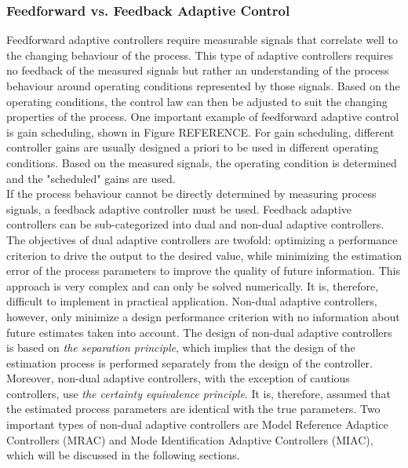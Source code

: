 \documentclass[9pt, twoside]{article}
\begin{document}
\begin{multicols}{2}
\subsubsection{Feedforward vs. Feedback Adaptive Control}
Feedforward adaptive controllers require measurable signals that correlate well to the changing behaviour of the process. This type of adaptive controllers requires no feedback of the measured signals but rather an understanding of the process behaviour around operating conditions represented by those signals. Based on the operating conditions, the control law can then be adjusted to suit the changing properties of the process. One important example of feedforward adaptive control is gain scheduling, shown in Figure REFERENCE. For gain scheduling, different controller gains are usually designed a priori to be used in different operating conditions. Based on the measured signals, the operating condition is determined and the "scheduled" gains are used.\\
If the process behaviour cannot be directly determined by measuring process signals, a feedback adaptive controller must be used. Feedback adaptive controllers can be sub-categorized into dual and non-dual adaptive controllers. The objectives of dual adaptive controllers are twofold: optimizing a performance criterion to drive the output to the desired value, while minimizing the estimation error of the process parameters to improve the quality of future information. This approach is very complex and can only be solved numerically. It is, therefore, difficult to implement in practical application. \cite{aastrom2013adaptive} Non-dual adaptive controllers, however, only minimize a design performance criterion with no information about future estimates taken into account. The design of non-dual adaptive controllers is based on \textit{the separation principle}, which implies that the design of the estimation process is performed separately from the design of the controller. Moreover, non-dual adaptive controllers, with the exception of cautious controllers, use \textit{the certainty equivalence principle}. It is, therefore, assumed that the estimated process parameters are identical with the true parameters. \cite{Isermann:1992:ACS:573881} Two important types of non-dual adaptive controllers are Model Reference Adaptice Controllers (MRAC) and Mode Identification Adaptive Controllers (MIAC), which will be discussed in the following sections.

\end{multicols}
\end{document}
